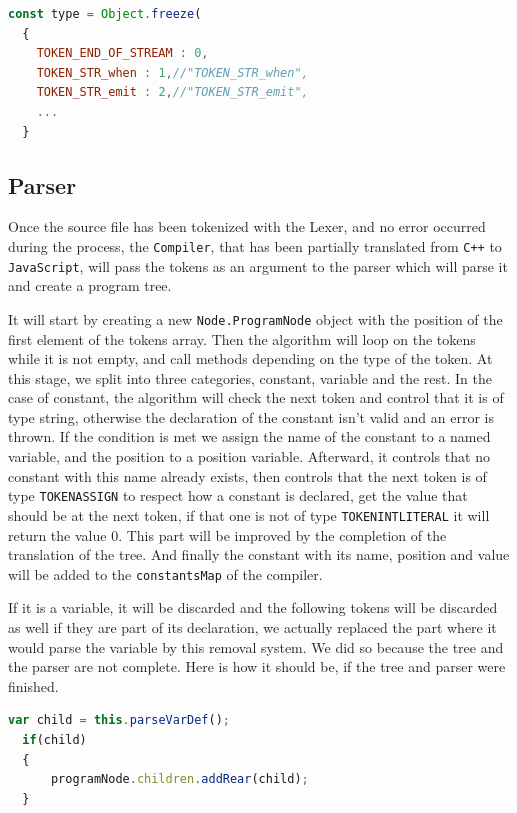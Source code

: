 \documentclass{scrbook}
\begin{document}
\begin{lstlisting}[language=JavaScript, gobble=2, basicstyle=\ttfamily\small]
  const type = Object.freeze( 
  {
    TOKEN_END_OF_STREAM : 0,
    TOKEN_STR_when : 1,//"TOKEN_STR_when",
    TOKEN_STR_emit : 2,//"TOKEN_STR_emit",
    ...
  }
\end{lstlisting}

\subsection{Parser}

Once the source file has been tokenized with the Lexer, and no error occurred during the process, the \texttt{Compiler}, that has been partially translated from \texttt{C++} to \texttt{JavaScript}, will pass the tokens as an argument to the parser which will parse it and create a program tree.

It will start by creating a new \texttt{Node.ProgramNode} object with the position of the first element of the tokens array. Then the algorithm will loop on the tokens while it is not empty, and call methods depending on the type of the token. At this stage, we split into three categories, constant, variable and the rest. 
In the case of constant, the algorithm will check the next token and control that it is of type string, otherwise the declaration of the constant isn’t valid and an error is thrown. If the condition is met we assign the name of the constant to a named variable, and the position to a position variable. 
Afterward, it controls that no constant with this name already exists, then controls that the next token is of type \texttt{TOKEN\textunderscore ASSIGN} to respect how a constant is declared, get the value that should be at the next token, if that one is not of type \texttt{TOKEN\textunderscore INT\textunderscore LITERAL} it will return the value 0. 
This part will be improved by the completion of the translation of the tree. And finally the constant with its name, position and value will be added to the \texttt{constantsMap} of the compiler.

If it is a variable, it will be discarded and the following tokens will be discarded as well if they are part of its declaration, we actually replaced the part where it would parse the variable by this removal system. We did so because the tree and the parser are not complete. 
Here is how it should be, if the tree and parser were finished.

\begin{lstlisting}[language=JavaScript, gobble=2, basicstyle=\ttfamily\small]
  var child = this.parseVarDef();
  if(child)
  {
      programNode.children.addRear(child);
  }
\end{lstlisting}
\end{document}
